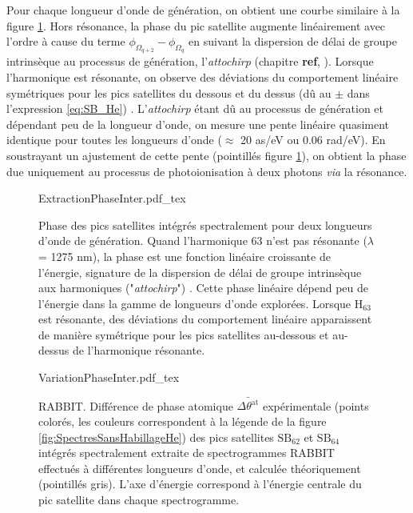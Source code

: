 Pour chaque longueur d'onde de génération, on obtient une courbe similaire à la figure \ref{fig:ExtractionPhaseInter}. Hors résonance, la phase du pic satellite augmente linéairement avec l'ordre à cause du terme $\phi_{\Omega_{q+2}} - \phi_{\Omega_{q}}$ en suivant la dispersion de délai de groupe intrinsèque au processus de génération, l'\textit{attochirp} (chapitre \textbf{ref}, ). Lorsque l'harmonique est résonante, on observe des déviations du comportement linéaire symétriques pour les pics satellites du dessous et du dessus (dû au $\pm$ dans l'expression \ref{eq:SB_He}) . L'\textit{attochirp} étant dû au processus de génération et dépendant peu de la longueur d'onde, on mesure une pente linéaire quasiment identique pour toutes les longueurs d'onde ($\approx$ 20 as/eV ou 0.06 rad/eV). En soustrayant un ajustement de cette pente (pointillés figure \ref{fig:ExtractionPhaseInter}), on obtient la phase due uniquement au processus de photoionisation à deux photons \textit{via} la résonance.

\begin{figure}
\centering
\def\svgwidth{\textwidth}
{ExtractionPhaseInter.pdf_tex}
\caption{Phase des pics satellites intégrés spectralement pour deux longueurs d'onde de génération. Quand l'harmonique 63 n'est pas résonante ($\lambda$ = 1275 nm), la phase est une fonction linéaire croissante de l'énergie, signature de la dispersion de délai de groupe intrinsèque aux harmoniques ("\textit{attochirp}") . Cette phase linéaire dépend peu de l'énergie dans la gamme de longueurs d'onde explorées. Lorsque $\text{H}_{63}$ est résonante, des déviations du comportement linéaire apparaissent de manière symétrique pour les pics satellites au-dessous et au-dessus de l'harmonique résonante.}
\label{fig:ExtractionPhaseInter}
\end{figure}

\begin{figure}
\centering
\def\svgwidth{\textwidth}
{VariationPhaseInter.pdf_tex}
\caption{RABBIT. Différence de phase atomique $\bar{\Delta \theta^{\text{at}}}$ expérimentale (points colorés, les couleurs correspondent à la légende de la figure \ref{fig:SpectresSansHabillageHe}) des pics satellites $\text{SB}_{62}$ et $\text{SB}_{64}$ intégrés spectralement extraite de spectrogrammes RABBIT effectués à différentes longueurs d'onde, et calculée théoriquement (pointillés gris). L'axe d'énergie correspond à l'énergie centrale du pic satellite dans chaque spectrogramme.}
\label{fig:VariationPhaseInter}
\end{figure}

